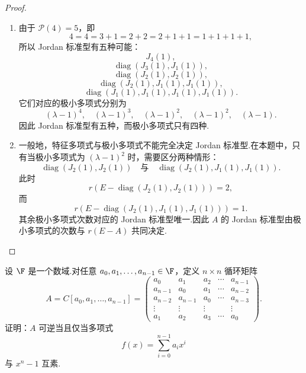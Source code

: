 \begin{proof}
	\begin{enumerate}
		\item 由于 $\mathcal{P}(4)=5$，即
		\[
		4=4=3+1=2+2=2+1+1=1+1+1+1,
		\]
		所以 Jordan 标准型有五种可能：
		\[
		J_4(1),
		\]
		\[
		\operatorname{diag}(J_3(1),J_1(1)),
		\]
		\[
		\operatorname{diag}(J_2(1),J_2(1)),
		\]
		\[
		\operatorname{diag}(J_2(1),J_1(1),J_1(1)),
		\]
		\[
		\operatorname{diag}(J_1(1),J_1(1),J_1(1),J_1(1)).
		\]
		它们对应的极小多项式分别为
		\[
		(\lambda-1)^4,
		\quad
		(\lambda-1)^3,
		\quad
		(\lambda-1)^2,
		\quad
		(\lambda-1)^2,
		\quad
		(\lambda-1).
		\]
		因此 Jordan 标准型有五种，而极小多项式只有四种.
		
		\item 一般地，特征多项式与极小多项式不能完全决定 Jordan 标准型.在本题中，只有当极小多项式为 $(\lambda-1)^2$ 时，需要区分两种情形：
		\[
		\operatorname{diag}(J_2(1),J_2(1))
		\quad\text{与}\quad
		\operatorname{diag}(J_2(1),J_1(1),J_1(1)).
		\]
		此时
		\[
		r(E-\operatorname{diag}(J_2(1),J_2(1)))=2,
		\]
		而
		\[
		r(E-\operatorname{diag}(J_2(1),J_1(1),J_1(1)))=1.
		\]
		其余极小多项式次数对应的 Jordan 标准型唯一.因此 $A$ 的 Jordan 标准型由极小多项式的次数与 $r(E-A)$ 共同决定.
	\end{enumerate}
\end{proof}

\begin{problem}[88]
	设 $\F$ 是一个数域.对任意 $a_0,a_1,\ldots,a_{n-1}\in\F$，定义 $n\times n$ 循环矩阵
	\[
	A=C[a_0,a_1,\ldots,a_{n-1}]
	=
	\begin{pmatrix}
		a_0&a_1&a_2&\cdots&a_{n-1}\\
		a_{n-1}&a_0&a_1&\cdots&a_{n-2}\\
		a_{n-2}&a_{n-1}&a_0&\cdots&a_{n-3}\\
		\vdots&\vdots&\vdots&&\vdots\\
		a_1&a_2&a_3&\cdots&a_0
	\end{pmatrix}.
	\]
	证明：$A$ 可逆当且仅当多项式
	\[
	f(x)=\sum_{i=0}^{n-1}a_ix^i
	\]
	与 $x^n-1$ 互素.
\end{problem}

